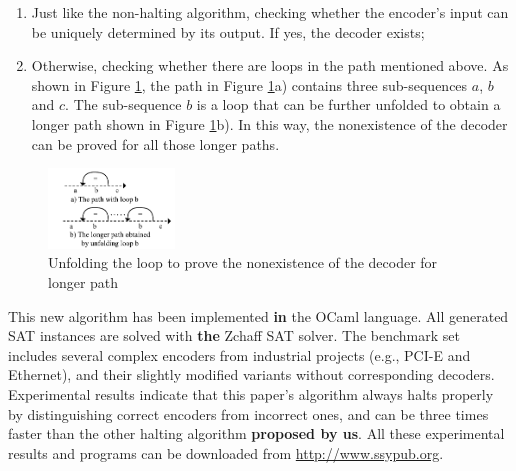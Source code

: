 \documentclass[journal]{IEEEtran}
\begin{document}
\begin{enumerate}
 \item Just like the non-halting algorithm\cite{ShengYuShen:iccad09,ShengYuShen:tcad},
       checking whether the encoder's input can be uniquely determined by its output.
      If yes, the decoder exists;
 \item Otherwise,
       checking whether there are loops in the path mentioned above.
       As shown in Figure \ref{doubleloop_unfold_cmp_simple},
       the path in Figure \ref{doubleloop_unfold_cmp_simple}a) contains three sub-sequences $a$, $b$ and $c$.
       The sub-sequence $b$ is a loop
       that can be further unfolded to obtain a longer path shown in Figure \ref{doubleloop_unfold_cmp_simple}b).
       In this way,
       the nonexistence of the decoder can be proved for all those longer paths.
\end{enumerate}

\begin{figure}[b]
\begin{center}
\includegraphics[width=0.3\textwidth]{doubleloop_unfold_cmp_simple}
\end{center}
\caption{Unfolding the loop to prove the nonexistence of the decoder for longer path}
  \label{doubleloop_unfold_cmp_simple}
\end{figure}

This new algorithm has been implemented \textbf{in} the OCaml language.
All generated SAT instances are solved with \textbf{the} Zchaff SAT solver\cite{CHAFF}.
The benchmark set includes several complex encoders from industrial projects
(e.g.,
PCI-E\cite{PCIESPEC} and Ethernet\cite{IEEE80232002}),
and their slightly modified variants without corresponding decoders.
Experimental results indicate that
this paper's algorithm always halts properly by distinguishing correct encoders from incorrect ones,
and can be three times faster than the other halting algorithm\cite{ShengYuShen:fmcad10} \textbf{proposed by us}.
All these experimental results and programs can be downloaded from \url{http://www.ssypub.org}.
\end{document}

